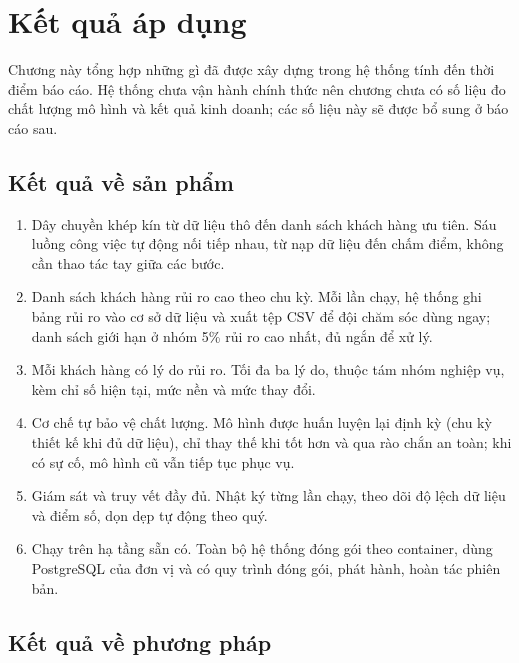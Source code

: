 
\chapter{Kết quả áp dụng}\label{ch:ketqua}

\begin{tomtat}
Chương này tổng hợp những gì đã được xây dựng trong hệ thống tính đến thời điểm báo cáo. Hệ thống chưa vận hành chính thức nên chương chưa có số liệu đo chất lượng mô hình và kết quả kinh doanh; các số liệu này sẽ được bổ sung ở báo cáo sau.
\end{tomtat}

\section{Kết quả về sản phẩm}

\begin{enumerate}
  \item Dây chuyền khép kín từ dữ liệu thô đến danh sách khách hàng ưu tiên. Sáu luồng công việc tự động nối tiếp nhau, từ nạp dữ liệu đến chấm điểm, không cần thao tác tay giữa các bước.
  \item Danh sách khách hàng rủi ro cao theo chu kỳ. Mỗi lần chạy, hệ thống ghi bảng rủi ro vào cơ sở dữ liệu và xuất tệp CSV để đội chăm sóc dùng ngay; danh sách giới hạn ở nhóm 5\% rủi ro cao nhất, đủ ngắn để xử lý.
  \item Mỗi khách hàng có lý do rủi ro. Tối đa ba lý do, thuộc tám nhóm nghiệp vụ, kèm chỉ số hiện tại, mức nền và mức thay đổi.
  \item Cơ chế tự bảo vệ chất lượng. Mô hình được huấn luyện lại định kỳ (chu kỳ thiết kế khi đủ dữ liệu), chỉ thay thế khi tốt hơn và qua rào chắn an toàn; khi có sự cố, mô hình cũ vẫn tiếp tục phục vụ.
  \item Giám sát và truy vết đầy đủ. Nhật ký từng lần chạy, theo dõi độ lệch dữ liệu và điểm số, dọn dẹp tự động theo quý.
  \item Chạy trên hạ tầng sẵn có. Toàn bộ hệ thống đóng gói theo container, dùng PostgreSQL của đơn vị và có quy trình đóng gói, phát hành, hoàn tác phiên bản.
\end{enumerate}

\section{Kết quả về phương pháp}

